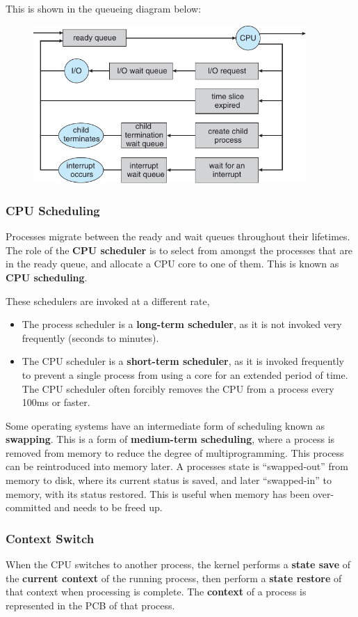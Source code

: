 \documentclass{article}
\begin{document}
This is shown in the queueing diagram below:
\begin{figure}[H]
    \centering
    \includegraphics[height = 6cm]{figures/queueing_diagram}
\end{figure}
\subsubsection{CPU Scheduling}
Processes migrate between the ready and wait queues throughout their
lifetimes. The role of the \textbf{CPU scheduler} is to select from
amongst the processes that are in the ready queue, and allocate a CPU
core to one of them. This is known as \textbf{CPU scheduling}.

These schedulers are invoked at a different rate,
\begin{itemize}
    \item The process scheduler is a \textbf{long-term scheduler}, as
          it is not invoked very frequently (seconds to minutes).
    \item The CPU scheduler is a \textbf{short-term scheduler}, as it
          is invoked frequently to prevent a single process from using
          a core for an extended period of time. The CPU scheduler
          often forcibly removes the CPU from a process every 100ms or
          faster.
\end{itemize}
Some operating systems have an intermediate form of scheduling known
as \textbf{swapping}.
This is a form of \textbf{medium-term scheduling}, where a process is
removed from memory to reduce the degree of multiprogramming.
This process can be reintroduced into memory later.
A processes state is ``swapped-out'' from memory to disk, where its
current status is saved, and later ``swapped-in'' to memory, with its
status restored.
This is useful when memory has been over-committed and needs to be freed
up.
\subsubsection{Context Switch}
When the CPU switches to another process, the kernel performs a
\textbf{state save} of the \textbf{current context} of the running
process, then perform a \textbf{state restore} of that context when
processing is complete. The \textbf{context} of a process is
represented in the PCB of that process.
\end{document}
